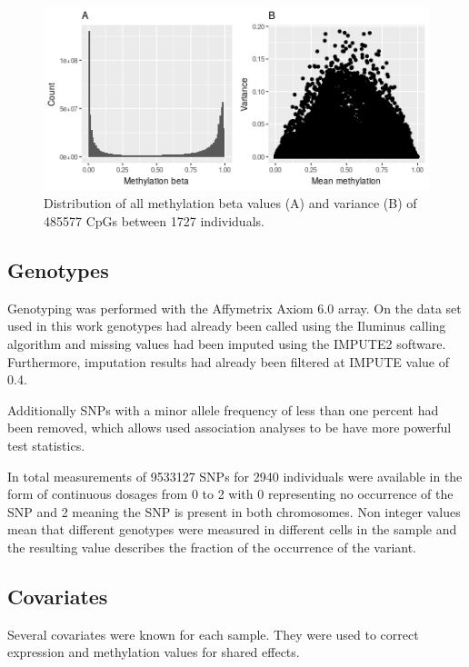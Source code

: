\documentclass[a4paper,12pt,twoside,openright]{report}
\begin{document}
 
\begin{figure}[tb]
	\includegraphics[scale = 1, keepaspectratio = true]{../figures/meth_raw_hist_var}  
	\caption{Distribution of all methylation beta values (A) and variance (B) of 485577 CpGs between 1727 individuals.}
    \label{fig:meth.raw.hist.var}
\end{figure}

 
\subsection{Genotypes}
\label{Data:Genotypes}
Genotyping was performed with the Affymetrix Axiom 6.0 array. On the data set used in this work genotypes had already been called using the Iluminus calling algorithm and missing values had been imputed using the IMPUTE2 software\cite{10.1371/journal.pgen.1000529}. Furthermore, imputation results had already been filtered at IMPUTE value of 0.4.  

Additionally SNPs with a minor allele frequency of less than one percent had been removed, which allows used association analyses to be have more powerful test statistics.

In total measurements of 9533127 SNPs for 2940 individuals were available in the form of continuous dosages from 0 to 2 with 0 representing no occurrence of the SNP and 2 meaning the SNP is present in both chromosomes. Non integer values mean that different genotypes were measured in different cells in the sample and the resulting value describes the fraction of the occurrence of the variant. 

\subsection{Covariates}
\label{Data:Covariates}
Several covariates were known for each sample. They were used to correct expression and methylation values for shared effects. 
\end{document}
